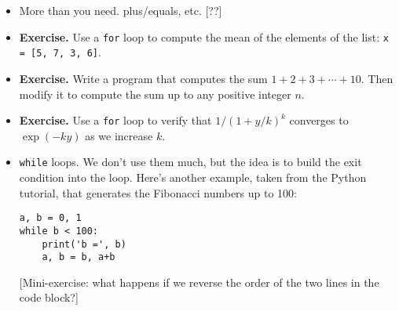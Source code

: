 \documentclass[11pt]{article}
\begin{document}
\begin{itemize}

Here's a more complex example.
One of the features of Fibonacci numbers is that the ratio of
successive numbers converges.
But what does it converge to?
We can compute the limit by repeating the operation and
stopping when we think we're close enough.
One measure of close enough is when the difference
between successive ratios is smaller than some very small number.
Here's an example:
\begin{verbatim}
a, b = 0, 1
ratio = a/b
maxit = 20
small_num = 1e-4
for it in range(maxit):
    a, b = b, a+b
    new_ratio = a/b
    print('At iteration', it, 'ratio =', new_ratio)
    if abs(new_ratio-ratio) < small_num:
        break       # exit loop
    else:
        ratio = new_ratio
\end{verbatim}
Note:
\begin{itemize}
\item Additional indentation of interior code blocks
(the {\tt if} and {\tt else} statements inside the {\tt for} loop).
\item The {\tt break} command.
This is new, it tells the program to exit the loop and go on to whatever
is next in the program.
\end{itemize}


\item More than you need.  plus/equals, etc.  [??]


\item {\bf Exercise.}
Use a {\tt for} loop to compute the mean of the elements of the list:  {\tt x = [5, 7, 3, 6]}.

\item {\bf Exercise.}
Write a program that computes the sum
$ 1 + 2 + 3 + \cdots + 10 $.
Then modify it to compute the sum up to any positive integer $n$.

\item {\bf Exercise.}
Use a {\tt for} loop to verify that $ 1/(1+y/k)^k $ converges to $\exp(-ky)$ as we increase $k$.


\item {\tt while} loops.
We don't use them much,
but the idea is to build the exit condition into the loop.
Here's another example, taken from the Python tutorial,
 that generates the Fibonacci numbers up to 100:
\begin{verbatim}
a, b = 0, 1
while b < 100:
    print('b =', b)
    a, b = b, a+b
\end{verbatim}
[Mini-exercise:  what happens if we reverse the order of the two lines in
the code block?]


\end{itemize}
\end{document}

